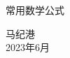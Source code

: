 \documentclass[main.tex]{subfiles}
\begin{document}
常用数学公式

\begin{flushright}
马纪港\\
2023年6月
\end{flushright}
\end{document}

